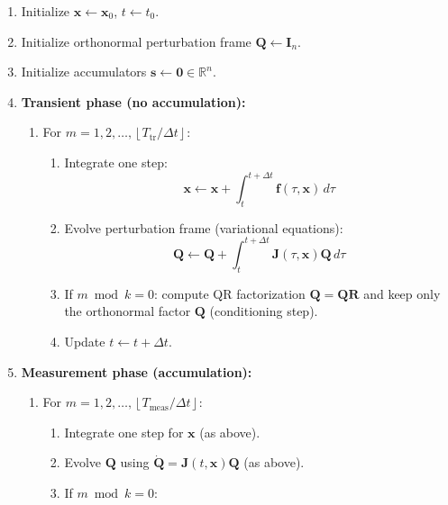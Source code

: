 \documentclass[11pt,a4paper]{report}
\begin{document}
\begin{center}
\begin{tcolorbox}[appendixalgobox,width=0.95\linewidth]
\vspace{0.5em}
\begin{enumerate}
  \item Initialize $\mathbf{x} \leftarrow \mathbf{x}_0$, $t \leftarrow t_0$.
  \item Initialize orthonormal perturbation frame $\mathbf{Q} \leftarrow \mathbf{I}_n$.
  \item Initialize accumulators $\mathbf{s} \leftarrow \mathbf{0} \in \mathbb{R}^n$.
  \item \textbf{Transient phase (no accumulation):}
    \begin{enumerate}
      \item For $m = 1,2,\dots,\left\lfloor T_{\mathrm{tr}}/\Delta t \right\rfloor$:
      \begin{enumerate}
        \item Integrate one step:
        \begin{equation*}
        \mathbf{x} \leftarrow \mathbf{x} + \int_{t}^{t+\Delta t}\mathbf{f}(\tau,\mathbf{x})\,d\tau
        \end{equation*}
        \item Evolve perturbation frame (variational equations):
        \begin{equation*}
        \mathbf{Q} \leftarrow \mathbf{Q} + \int_{t}^{t+\Delta t}\mathbf{J}(\tau,\mathbf{x})\mathbf{Q}\,d\tau
        \end{equation*}
        \item If $m \bmod k = 0$: compute QR factorization $\mathbf{Q} = \mathbf{Q}\mathbf{R}$
              and keep only the orthonormal factor $\mathbf{Q}$ (conditioning step).
        \item Update $t \leftarrow t + \Delta t$.
      \end{enumerate}
    \end{enumerate}
  \item \textbf{Measurement phase (accumulation):}
    \begin{enumerate}
      \item For $m = 1,2,\dots,\left\lfloor T_{\mathrm{meas}}/\Delta t \right\rfloor$:
      \begin{enumerate}
        \item Integrate one step for $\mathbf{x}$ (as above).
        \item Evolve $\mathbf{Q}$ using $\dot{\mathbf{Q}}=\mathbf{J}(t,\mathbf{x})\mathbf{Q}$ (as above).
        \item If $m \bmod k = 0$:
          \begin{enumerate}

\end{enumerate}
\end{enumerate}
\end{enumerate}
\end{enumerate}
\end{tcolorbox}
\end{center}
\end{document}
